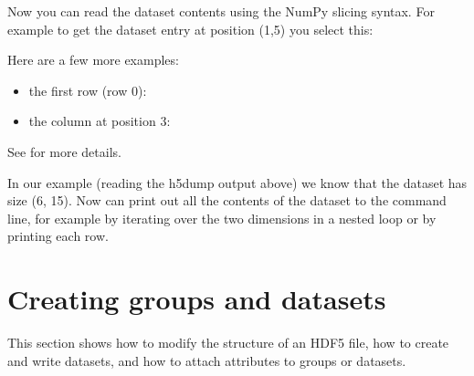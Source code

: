 \documentclass[letterpaper,10pt,english]{sphinxmanual}
\begin{document}
\begin{sphinxVerbatim}[commandchars=\\\{\}]
  \PYG{p}{[}\PYG{p}{]}
\end{sphinxVerbatim}

\sphinxAtStartPar
Now you can read the dataset contents using the NumPy slicing syntax. For example to get the dataset entry at position (1,5) you select this:

\begin{sphinxVerbatim}[commandchars=\\\{\}]
\PYG{p}{[} \PYG{p}{]}
\end{sphinxVerbatim}

\sphinxAtStartPar
Here are a few more examples:
\begin{itemize}
\item {} 
\sphinxAtStartPar
the first row (row 0):

\begin{sphinxVerbatim}[commandchars=\\\{\}]
\PYG{p}{[}\PYG{p}{]}\PYG{p}{[}\PYG{p}{]}
\end{sphinxVerbatim}

\item {} 
\sphinxAtStartPar
the column at position 3:

\begin{sphinxVerbatim}[commandchars=\\\{\}]
\PYG{p}{[} \PYG{p}{]}
\end{sphinxVerbatim}

\end{itemize}

\sphinxAtStartPar
See  for more details.

\sphinxAtStartPar
In our example (reading the h5dump output above) we know that the dataset has size (6, 15). Now can print out all the contents of the dataset to the command line, for example by iterating over the two dimensions in a nested loop or by printing each row.


\chapter{Creating groups and datasets}
\label{\detokenize{index:creating-groups-and-datasets}}
\sphinxAtStartPar
This section shows how to modify the structure of an HDF5 file, how to create and write datasets, and how to attach
attributes to groups or datasets.
\end{document}
